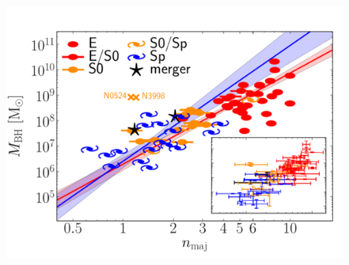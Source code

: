 \documentclass[preprint2]{emulateapj}
\begin{document}
\begin{figure}[h]
\begin{center}
\includegraphics[width=\columnwidth]{images/mbh_vs_n_maj.pdf}
\caption{}
\label{fig:mbhn}
\end{center}
\end{figure}
\end{document}
